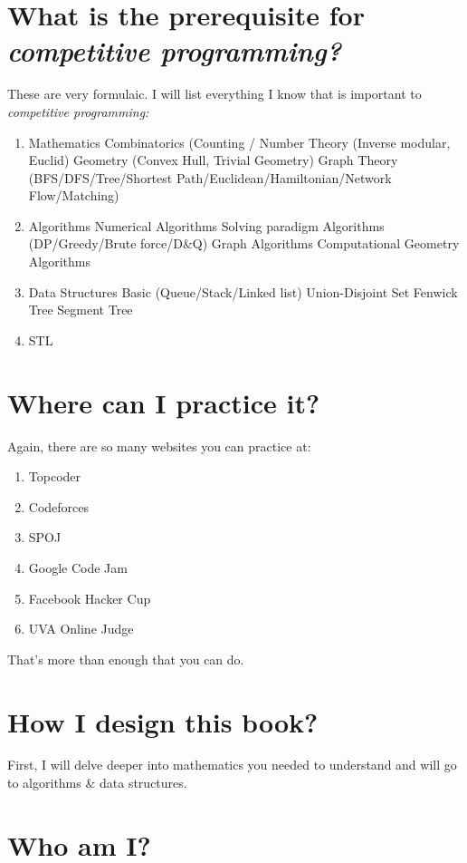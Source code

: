 \section{What is the prerequisite for \it{competitive programming}?}
These are very formulaic. I will list everything I know that is important to \it{competitive programming}:
\begin{enumerate}
	\item Mathematics
	\subitem Combinatorics (Counting / 
	\subitem Number Theory (Inverse modular, Euclid)
	\subitem Geometry (Convex Hull, Trivial Geometry)
	\subitem Graph Theory (BFS/DFS/Tree/Shortest Path/Euclidean/Hamiltonian/Network Flow/Matching)
	\item Algorithms
	\subitem Numerical Algorithms
	\subitem Solving paradigm Algorithms (DP/Greedy/Brute force/D\&Q)
	\subitem Graph Algorithms
	\subitem Computational Geometry Algorithms
	\item Data Structures
	\subitem Basic (Queue/Stack/Linked list)
	\subitem Union-Disjoint Set
	\subitem Fenwick Tree
	\subitem Segment Tree
	\item STL
\end{enumerate}

\section{Where can I practice it?}
Again, there are so many websites you can practice at:
\begin{enumerate}
	\item Topcoder
	\item Codeforces
	\item SPOJ
	\item Google Code Jam
	\item Facebook Hacker Cup
	\item UVA Online Judge
\end{enumerate}
That's more than enough that you can do.

\section{How I design this book?}
First, I will delve deeper into mathematics you needed to understand and will go to algorithms \& data structures.

\section{Who am I?}
